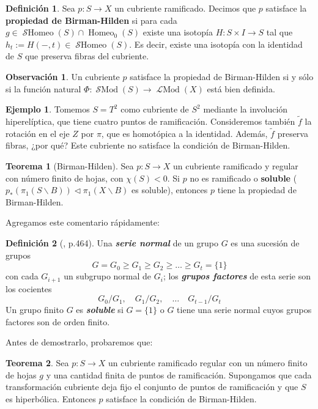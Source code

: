 \documentclass[spanish]{article}
\theoremstyle{definition}
\newtheorem*{defn}{Definición}
\newtheorem*{obs}{Observación}
\newtheorem*{teo}{Teorema}
\newtheorem*{ejem}{Ejemplo}
\DeclareMathOperator{\Homeo}{Homeo}
\DeclareMathOperator{\SMod}{\mathcal{S}Mod}
\DeclareMathOperator{\LMod}{\mathcal{L}Mod}
\DeclareMathOperator{\SHomeo}{\mathcal{S}Homeo}
\begin{document}
\begin{defn}
	Sea $p:S\to X$ un cubriente ramificado. Decimos que $p$ satisface la \textbf{propiedad de Birman-Hilden} si para cada $g\in\SHomeo(S)\cap\Homeo_0(S)$ existe una isotopía $H:S\times I\to S$ tal que $h_t:=H(-,t)\in\SHomeo(S)$. Es decir, existe una isotopía con la identidad de $S$ que preserva fibras del cubriente.
\end{defn}
\begin{obs}
	Un cubriente $p$ satisface la propiedad de Birman-Hilden si y sólo si la función natural $\Phi:\SMod(S)\to\LMod(X)$ está bien definida.
\end{obs}
\begin{ejem}
	Tomemos $S=T^2$ como cubriente de $S^2$ mediante la involución hiperelíptica, que tiene cuatro puntos de ramificación. Consideremos también $\tilde{f}$ la rotación en el eje $Z$ por $\pi$, que es homotópica a la identidad. Además, $\tilde{f}$ preserva fibras, ¿por qué? Este cubriente no satisface la condición de Birman-Hilden.
\end{ejem}
\begin{teo}[Birman-Hilden]
	Sea $p:S\to X$ un cubriente ramificado y regular con número finito de hojas, con $\chi(S)<0$. Si $p$ no es ramificado o \textbf{soluble} ($p_*(\pi_1(S\backslash B))\triangleleft\pi_1(X\backslash B)$ es soluble), entonces $p$ tiene la propiedad de Birman-Hilden.
\end{teo}
Agregamos este comentario rápidamente:
\begin{defn}[\cite{Rotman}, p.464]
	Una \textbf{\textit{serie normal}} de un grupo $G$ es una sucesión de grupos 
	\[G=G_0\geq G_1\geq G_2\geq\ldots\geq G_t=\{1\}\]
	con cada $G_{i+1}$ un subgrupo normal de $G_i$; los \textbf{\textit{grupos factores}} de esta serie son los cocientes
	\[G_0/G_1,\quad G_1/G_2,\quad\ldots\quad G_{t-1}/G_t\]
	Un grupo finito $G$ es \textbf{\textit{soluble}} si $G=\{1\}$ o $G$ tiene una serie normal cuyos grupos factores son de orden finito.
\end{defn}

Antes de demostrarlo, probaremos que:
\begin{teo}
	Sea $p:S\to X$ un cubriente ramificado regular con un número finito de hojas $g$ y una cantidad finita de puntos de ramificación. Supongamos que cada transformación cubriente deja fijo el conjunto de puntos de ramificación y que $S$ es hiperbólica.  Entonces $p$ satisface la condición de Birman-Hilden.
\end{teo}
\end{document}
